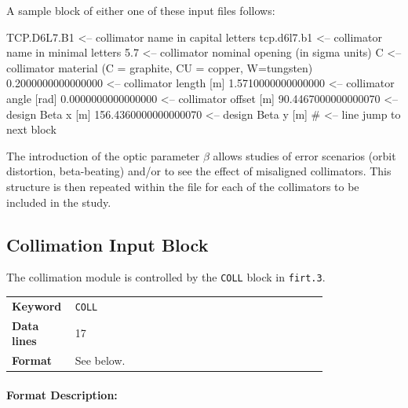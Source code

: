 A sample block of either one of these input files follows:

\begin{cverbatim}
TCP.D6L7.B1             <-- collimator name in capital letters
tcp.d6l7.b1             <-- collimator name in minimal letters
5.7                     <-- collimator nominal opening (in sigma units)
C                       <-- collimator material (C = graphite, CU = copper, W=tungsten)
  0.2000000000000000    <-- collimator length [m]
  1.5710000000000000    <-- collimator angle [rad]
  0.0000000000000000    <-- collimator offset [m]
 90.4467000000000070    <-- design Beta x [m]
156.4360000000000070    <-- design Beta y [m]
#                       <-- line jump to next block
\end{cverbatim}

The introduction of the optic parameter $\beta$ allows studies of error scenarios (orbit distortion, beta-beating) and/or to see the effect of misaligned collimators.
This structure is then repeated within the file for each of the collimators to be included in the study.

\subsection{Collimation Input Block} \label{sec:coll:input}

The collimation module is controlled by the \texttt{COLL} block in \texttt{firt.3}.

\bigskip
\begin{tabular}{@{}lp{0.8\linewidth}}
    \textbf{Keyword}    & \texttt{COLL}\index{COLL} \\
    \textbf{Data lines} & 17\\
    \textbf{Format}     & See below.
\end{tabular}

\paragraph{Format Description:}~\\

